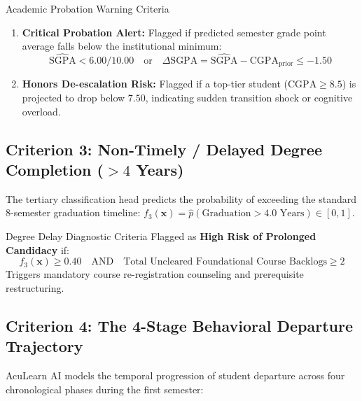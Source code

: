 \documentclass[10pt,a4paper]{article}
\begin{document}
\begin{criteriabox}{Academic Probation Warning Criteria}
\begin{enumerate}[noitemsep, topsep=2pt]
  \item \textbf{Critical Probation Alert:} Flagged if predicted semester grade point average falls below the institutional minimum:
  \begin{equation}
    \widehat{\text{SGPA}} < 6.00 / 10.00 \quad \text{or} \quad \Delta \text{SGPA} = \widehat{\text{SGPA}} - \text{CGPA}_{\text{prior}} \le -1.50
  \end{equation}
  \item \textbf{Honors De-escalation Risk:} Flagged if a top-tier student ($\text{CGPA} \ge 8.5$) is projected to drop below $7.50$, indicating sudden transition shock or cognitive overload.
\end{enumerate}
\end{criteriabox}

\subsection{Criterion 3: Non-Timely / Delayed Degree Completion ($> 4$ Years)}
The tertiary classification head predicts the probability of exceeding the standard 8-semester graduation timeline:
$f_3(\mathbf{x}) = \hat{p}(\text{Graduation} > 4.0\text{ Years}) \in [0, 1]$.

\begin{criteriabox}{Degree Delay Diagnostic Criteria}
Flagged as \textbf{High Risk of Prolonged Candidacy} if:
\begin{equation}
  f_3(\mathbf{x}) \ge 0.40 \quad \text{AND} \quad \text{Total Uncleared Foundational Course Backlogs} \ge 2
\end{equation}
Triggers mandatory course re-registration counseling and prerequisite restructuring.
\end{criteriabox}

\newpage
\subsection{Criterion 4: The 4-Stage Behavioral Departure Trajectory}
AcuLearn AI models the temporal progression of student departure across four chronological phases during the first semester:
\end{document}
